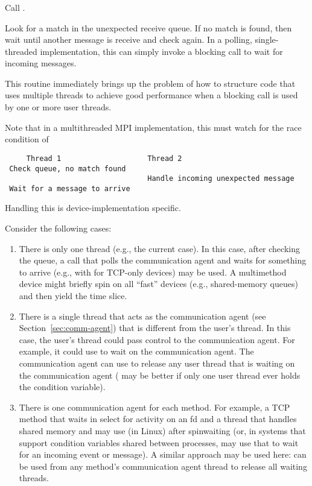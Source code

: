 \documentclass{article}
\begin{document}
\subsubsection{}
\begin{adi3}
Call .
\begin{mmadi}
Look for a match in the unexpected receive queue. 
If no match is found, then wait until another message is receive and check
again.  In a polling, single-threaded implementation, this can simply invoke a
blocking call to wait for incoming messages. 

This routine immediately brings up the problem of how to structure code that
uses multiple threads to achieve good performance when a blocking call is used
by one or more user threads.

Note that in a multithreaded MPI implementation, this must watch for the race
condition of
\begin{verbatim}
     Thread 1                    Thread 2
 Check queue, no match found
                                 Handle incoming unexpected message
 Wait for a message to arrive
\end{verbatim}
Handling this is device-implementation specific.

Consider the following cases:
\begin{enumerate}
\item There is only one thread (e.g., the current  case).  In this
  case, after checking the queue, a call that polls the communication agent
  and waits for something to arrive (e.g., with  for TCP-only
  devices) may be used.  A multimethod device might briefly spin on all
  ``fast'' devices (e.g., shared-memory queues) and then yield the time slice.
\item There is a single thread that acts as the communication agent (see
  Section~\ref{sec:comm-agent}) that is different from the user's thread.
  In this case, the user's thread could pass control to the communication
  agent.  For example, it could use  to wait on the
  communication agent.  The communication agent can use
   to release any user thread that is waiting on
  the communication agent ( may be better if only
  one user thread ever holds the condition variable).
\item There is one communication agent for each method.  For example,
  a TCP method that waits in select for activity on an fd and a thread that
  handles shared memory and may use (in Linux)  after
  spinwaiting (or, in systems that support condition variables shared between
  processes, may use that to wait for an incoming event or message).
  A similar approach may be used here:  can be
  used from any method's communication agent thread to release all waiting
  threads. 
\end{enumerate}


\end{mmadi}
\end{adi3}
\end{document}
